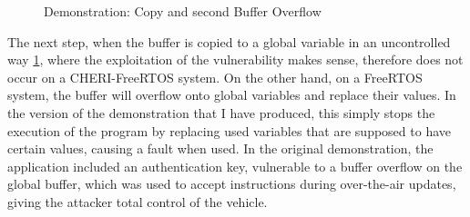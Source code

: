 \documentclass[a4paper, 11pt]{article}
\begin{document}
\begin{figure}
        \begin{center}
        \end{center}
        \caption{Demonstration: Copy and second Buffer Overflow} 
		\label{fig:demo_copy}

\end{figure}
The next step, when the buffer is copied to a global variable in an uncontrolled way \ref{fig:demo_copy}, where the exploitation of the vulnerability makes sense, therefore does not occur on a CHERI-FreeRTOS system. On the other hand, on a FreeRTOS system, the buffer will overflow onto global variables and replace their values. In the version of the demonstration that I have produced, this simply stops the execution of the program by replacing used variables that are supposed to have certain values, causing a fault when used. In the original demonstration, the application included an authentication key, vulnerable to a buffer overflow on the global buffer, which was used to accept instructions during over-the-air updates, giving the attacker total control of the vehicle. 
\newcommand{\threeRect}[5]{
        \draw (#1,#2) rectangle (#1+5,#2+1);
        \draw (#1,#2+1) rectangle (#1+5,#2+2);
        \draw (#1,#2+2) rectangle (#1+5,#2+3);
        \node at (#1+2.5,0.5) {#3};
        \node at (#1+2.5,1.5) {#4};
        \node at (#1+2.5,2.5) {#5};

}
\end{document}
